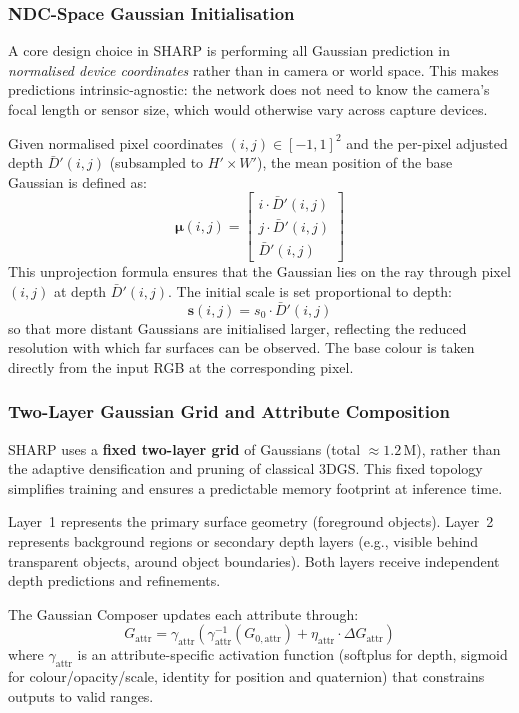 \subsubsection{NDC-Space Gaussian Initialisation}

A core design choice in SHARP is performing all Gaussian prediction in \emph{normalised device coordinates} rather than in camera or world space. This makes predictions intrinsic-agnostic: the network does not need to know the camera's focal length or sensor size, which would otherwise vary across capture devices.

Given normalised pixel coordinates $(i, j) \in [-1, 1]^2$ and the per-pixel adjusted depth $\bar{D}'(i,j)$ (subsampled to $H' \times W'$), the mean position of the base Gaussian is defined as:
\[
    \boldsymbol{\mu}(i,j) = \begin{bmatrix} i \cdot \bar{D}'(i,j) \\ j \cdot \bar{D}'(i,j) \\ \bar{D}'(i,j) \end{bmatrix}
\]
This unprojection formula ensures that the Gaussian lies on the ray through pixel $(i,j)$ at depth $\bar{D}'(i,j)$. The initial scale is set proportional to depth:
\[
    \mathbf{s}(i,j) = s_0 \cdot \bar{D}'(i,j)
\]
so that more distant Gaussians are initialised larger, reflecting the reduced resolution with which far surfaces can be observed. The base colour is taken directly from the input RGB at the corresponding pixel.

\subsubsection{Two-Layer Gaussian Grid and Attribute Composition}

SHARP uses a \textbf{fixed two-layer grid} of Gaussians (total $\approx 1.2$\,M), rather than the adaptive densification and pruning of classical 3DGS. This fixed topology simplifies training and ensures a predictable memory footprint at inference time.

Layer~1 represents the primary surface geometry (foreground objects). Layer~2 represents background regions or secondary depth layers (e.g., visible behind transparent objects, around object boundaries). Both layers receive independent depth predictions and refinements.

The Gaussian Composer updates each attribute through:
\[
    G_{\text{attr}} = \gamma_{\text{attr}}\!\left(\gamma_{\text{attr}}^{-1}(G_{0,\text{attr}}) + \eta_{\text{attr}} \cdot \Delta G_{\text{attr}}\right)
\]
where $\gamma_{\text{attr}}$ is an attribute-specific activation function (softplus for depth, sigmoid for colour/opacity/scale, identity for position and quaternion) that constrains outputs to valid ranges.

